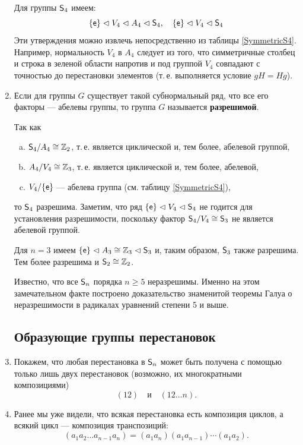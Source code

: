 \begin{enumerate}
Для группы ${\mathsf{S}}_4$ имеем: 
$$
\{\mathsf e\}\vartriangleleft V_4\vartriangleleft A_4\vartriangleleft{\mathsf{S}}_4,\quad\{\mathsf e\}\vartriangleleft V_4\vartriangleleft{\mathsf{S}}_4
$$
Эти утверждения можно извлечь непосредственно из таблицы \ref{SymmetricS4}. Например, нормальность $V_4$ в $A_4$ следует из того, что симметричные столбец и строка в зеленой области напротив и под группой $V_4$ совпадают с точностью до перестановки элементов (т.\,е. выполняется условие $gH=Hg$).

\item Если для группы $G$ существует такой субнормальный ряд, что все его факторы --- абелевы группы, то группа $G$ называется \textbf{разрешимой}.

Так как
\begin{enumerate}[a)]
\item ${\mathsf{S}}_4/A_4\cong\mathbb Z_2$, т.\,е. является циклической и, тем более, абелевой группой,
\item $A_4/V_4\cong\mathbb Z_3$, т.\,е. является циклической и, тем более, абелевой,
\item $V_4/\{\mathsf e\}$ --- абелева группа (см. таблицу \ref{SymmetricS4}),
\end{enumerate}
то ${\mathsf{S}}_4$ разрешима. Заметим, что ряд $\{\mathsf e\}\vartriangleleft V_4\vartriangleleft{\mathsf{S}}_4$ не годится для установления разрешимости, поскольку фактор ${\mathsf{S}}_4/V_4\cong{\mathsf{S}}_3$ не является абелевой группой.

Для $n=3$ имеем $\{\mathsf e\}\vartriangleleft A_3\cong\mathbb Z_3\vartriangleleft{\mathsf{S}}_3$ и, таким образом, ${\mathsf{S}}_3$ также разрешима. Тем более разрешима и ${\mathsf{S}}_2\cong\mathbb Z_2$.

Известно, что все ${\mathsf{S}}_n$ порядка $n\ge 5$ неразрешимы. Именно на этом замечательном факте построено доказательство знаменитой теоремы Галуа о неразрешимости в радикалах уравнений степени 5 и выше.


\subsection*{Образующие группы перестановок}

\item Покажем, что любая перестановка в ${\mathsf{S}}_n$ может быть получена с помощью только лишь двух перестановок (возможно, их многократными композициями)
$$
(12)\quad\mbox{и}\quad(12\dots n).
$$
\item Ранее мы уже видели, что всякая перестановка есть композиция циклов, а всякий цикл --- композиция транспозиций:
\begin{equation}\label{transp}
(a_1a_2\dots a_{n-1}a_n) = (a_1a_n)(a_1a_{n-1})\cdots(a_1a_2).
\end{equation}


\end{enumerate}
